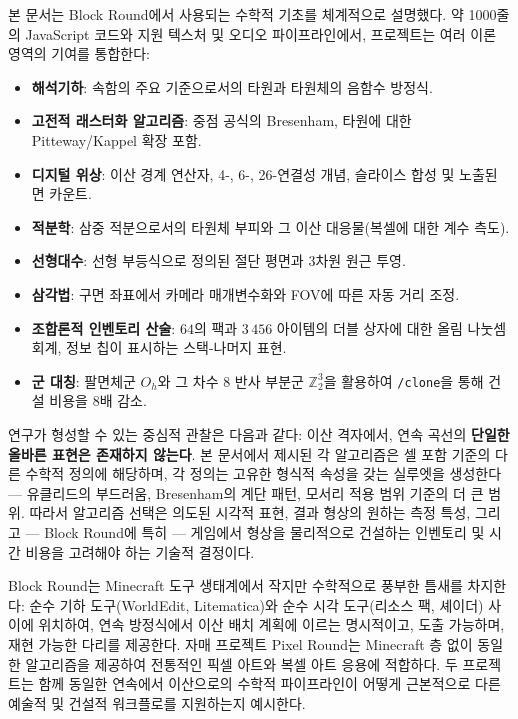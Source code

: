 \documentclass[12pt,a4paper]{scrartcl}
\newcommand{\acc}[1]{\textcolor{accent}{\textbf{#1}}}
\newcommand{\cmd}[1]{\textcolor{earth}{\texttt{\small #1}}}
\begin{document}
본 문서는 Block Round에서 사용되는 수학적 기초를 체계적으로 설명했다. 약 1000줄의 JavaScript 코드와 지원 텍스처 및 오디오 파이프라인에서, 프로젝트는 여러 이론 영역의 기여를 통합한다:

\begin{itemize}[leftmargin=1.3em,itemsep=0.25em,topsep=0.4em]
  \item \acc{해석기하}: 속함의 주요 기준으로서의 타원과 타원체의 음함수 방정식.
  \item \acc{고전적 래스터화 알고리즘}: 중점 공식의 Bresenham, 타원에 대한 Pitteway/Kappel 확장 포함.
  \item \acc{디지털 위상}: 이산 경계 연산자, 4-, 6-, 26-연결성 개념, 슬라이스 합성 및 노출된 면 카운트.
  \item \acc{적분학}: 삼중 적분으로서의 타원체 부피와 그 이산 대응물(복셀에 대한 계수 측도).
  \item \acc{선형대수}: 선형 부등식으로 정의된 절단 평면과 3차원 원근 투영.
  \item \acc{삼각법}: 구면 좌표에서 카메라 매개변수화와 FOV에 따른 자동 거리 조정.
  \item \acc{조합론적 인벤토리 산술}: $64$의 팩과 $3\,456$ 아이템의 더블 상자에 대한 올림 나눗셈 회계, 정보 칩이 표시하는 스택-나머지 표현.
  \item \acc{군 대칭}: 팔면체군 $O_h$와 그 차수 $8$ 반사 부분군 $\mathbb{Z}_2^3$을 활용하여 \cmd{/clone}을 통해 건설 비용을 $8$배 감소.
\end{itemize}

연구가 형성할 수 있는 중심적 관찰은 다음과 같다: 이산 격자에서, 연속 곡선의 \acc{단일한 올바른 표현은 존재하지 않는다}. 본 문서에서 제시된 각 알고리즘은 셀 포함 기준의 다른 수학적 정의에 해당하며, 각 정의는 고유한 형식적 속성을 갖는 실루엣을 생성한다 — 유클리드의 부드러움, Bresenham의 계단 패턴, 모서리 적용 범위 기준의 더 큰 범위. 따라서 알고리즘 선택은 의도된 시각적 표현, 결과 형상의 원하는 측정 특성, 그리고 — Block Round에 특히 — 게임에서 형상을 물리적으로 건설하는 인벤토리 및 시간 비용을 고려해야 하는 기술적 결정이다.

Block Round는 Minecraft 도구 생태계에서 작지만 수학적으로 풍부한 틈새를 차지한다: 순수 기하 도구(WorldEdit, Litematica)와 순수 시각 도구(리소스 팩, 셰이더) 사이에 위치하여, 연속 방정식에서 이산 배치 계획에 이르는 명시적이고, 도출 가능하며, 재현 가능한 다리를 제공한다. 자매 프로젝트 Pixel Round는 Minecraft 층 없이 동일한 알고리즘을 제공하여 전통적인 픽셀 아트와 복셀 아트 응용에 적합하다. 두 프로젝트는 함께 동일한 연속에서 이산으로의 수학적 파이프라인이 어떻게 근본적으로 다른 예술적 및 건설적 워크플로를 지원하는지 예시한다.
\end{document}
